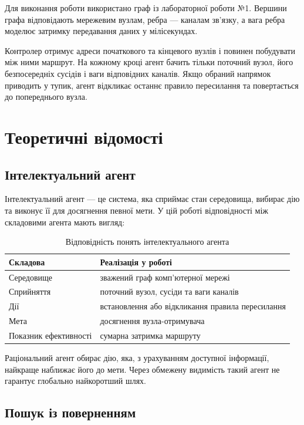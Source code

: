 \documentclass[12pt,a4paper]{article}
\begin{document}
Для виконання роботи використано граф із лабораторної роботи №1. Вершини
графа відповідають мережевим вузлам, ребра --- каналам зв'язку, а вага ребра
моделює затримку передавання даних у мілісекундах.

Контролер отримує адреси початкового та кінцевого вузлів і повинен побудувати
між ними маршрут. На кожному кроці агент бачить тільки поточний вузол, його
безпосередніх сусідів і ваги відповідних каналів. Якщо обраний напрямок
приводить у тупик, агент відкликає останнє правило пересилання та повертається
до попереднього вузла.

\section{Теоретичні відомості}

\subsection{Інтелектуальний агент}

Інтелектуальний агент --- це система, яка сприймає стан середовища, вибирає
дію та виконує її для досягнення певної мети. У цій роботі відповідності між
складовими агента мають вигляд:

\begin{table}[H]
\centering
\begin{tabular}{>{\raggedright\arraybackslash}p{} p{}}
\toprule
\textbf{Складова} & \textbf{Реалізація у роботі}\\
\midrule
Середовище & зважений граф комп'ютерної мережі\\
Сприйняття & поточний вузол, сусіди та ваги каналів\\
Дії & встановлення або відкликання правила пересилання\\
Мета & досягнення вузла-отримувача\\
Показник ефективності & сумарна затримка маршруту\\
\bottomrule
\end{tabular}
\caption{Відповідність понять інтелектуального агента}
\end{table}

Раціональний агент обирає дію, яка, з урахуванням доступної інформації,
найкраще наближає його до мети. Через обмежену видимість такий агент не
гарантує глобально найкоротший шлях.

\subsection{Пошук із поверненням}
\end{document}
